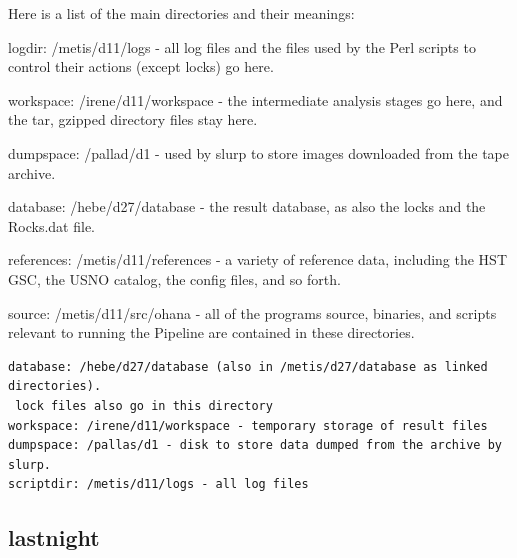 \documentclass{article}
\begin{document}
Here is a list of the main directories and their meanings:

logdir:         /metis/d11/logs - all log files and the files used by
the Perl scripts to control their actions (except locks) go here.

workspace:      /irene/d11/workspace - the intermediate analysis
stages go here, and the tar, gzipped directory files stay here.

dumpspace:      /pallad/d1      - used by slurp to store images
downloaded from the tape archive.

database:       /hebe/d27/database      - the result database, as also
the locks and the Rocks.dat file.

references:     /metis/d11/references   - a variety of reference data,
including the HST GSC, the USNO catalog, the config files, and so
forth.

source:         /metis/d11/src/ohana    - all of the programs source, 
binaries, and scripts relevant to running the Pipeline are contained
in these directories.  

\begin{verbatim}
database: /hebe/d27/database (also in /metis/d27/database as linked directories).
 lock files also go in this directory
workspace: /irene/d11/workspace - temporary storage of result files
dumpspace: /pallas/d1 - disk to store data dumped from the archive by slurp.
scriptdir: /metis/d11/logs - all log files
\end{verbatim}

\subsection{lastnight}
\end{document}
